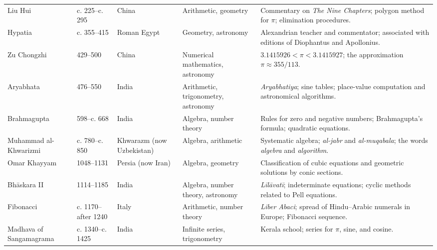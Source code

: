 {\begin{longtable}{@{}L{0.145\textwidth}L{0.09\textwidth}L{0.225\textwidth}L{0.14\textwidth}L{0.30\textwidth}@{}}
        Liu Hui
        & c. 225--c. 295
        & China
        & Arithmetic, geometry
        & Commentary on \textit{The Nine Chapters}; polygon method for $\pi$;
          elimination procedures. \\

        Hypatia
        & c. 355--415
        & Roman Egypt
        & Geometry, astronomy
        & Alexandrian teacher and commentator; associated with editions of
          Diophantus and Apollonius. \\

        Zu Chongzhi
        & 429--500
        & China
        & Numerical mathematics, astronomy
        & $3.1415926<\pi<3.1415927$; the approximation
          $\pi\approx 355/113$. \\

        Aryabhata
        & 476--550
        & India
        & Arithmetic, trigonometry, astronomy
        & \textit{Aryabhatiya}; sine tables; place-value computation and
          astronomical algorithms. \\

        Brahmagupta
        & 598--c. 668
        & India
        & Algebra, number theory
        & Rules for zero and negative numbers; Brahmagupta's formula; quadratic
          equations. \\

        Muhammad al-Khwarizmi
        & c. 780--c. 850
        & Khwarazm (now Uzbekistan)
        & Algebra, arithmetic
        & Systematic algebra; \emph{al-jabr} and \emph{al-muqabala}; the words
          \emph{algebra} and \emph{algorithm}. \\

        Omar Khayyam
        & 1048--1131
        & Persia (now Iran)
        & Algebra, geometry
        & Classification of cubic equations and geometric solutions by conic
          sections. \\

        Bhāskara II
        & 1114--1185
        & India
        & Algebra, number theory, astronomy
        & \textit{Līlāvatī}; indeterminate equations; cyclic methods related to
          Pell equations. \\

        Fibonacci
        & c. 1170--after 1240
        & Italy
        & Arithmetic, number theory
        & \textit{Liber Abaci}; spread of Hindu--Arabic numerals in Europe;
          Fibonacci sequence. \\

        Madhava of Sangamagrama
        & c. 1340--c. 1425
        & India
        & Infinite series, trigonometry
        & Kerala school; series for $\pi$, sine, and cosine. \\


\end{longtable}}
